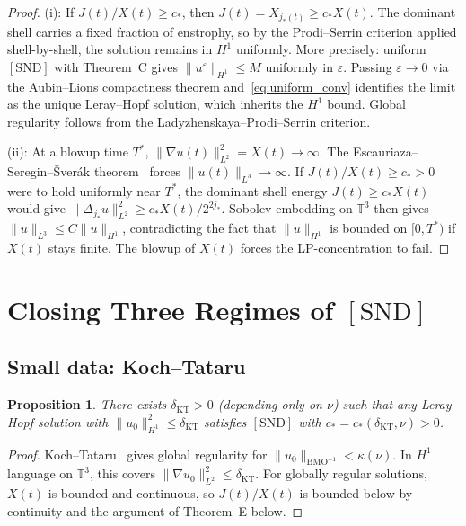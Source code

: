 \documentclass[11pt]{article}
\newtheorem{proposition}[theorem]{Proposition}
\newcommand{\eps}{\varepsilon}
\newcommand{\norm}[2]{\|{#1}\|_{#2}}
\newcommand{\T}{\mathbb{T}}
\begin{document}
\begin{proof}
(i): If $J(t)/X(t)\ge c_*$, then $J(t) = X_{j_*(t)}\ge c_* X(t)$.
The dominant shell carries a fixed fraction of enstrophy, so by
the Prodi--Serrin criterion applied shell-by-shell, the solution
remains in $H^1$ uniformly.
More precisely: uniform $[\mathrm{SND}]$ with Theorem~C gives
$\norm{u^\eps}{H^1}\le M$ uniformly in $\eps$. Passing $\eps\to0$
via the Aubin--Lions compactness theorem and~\eqref{eq:uniform_conv}
identifies the limit as the unique Leray--Hopf solution,
which inherits the $H^1$ bound. Global regularity follows from
the Ladyzhenskaya--Prodi--Serrin criterion.

(ii): At a blowup time $T^*$,
$\norm{\nabla u(t)}{L^2}^2 = X(t)\to\infty$.
The Escauriaza--Seregin--\v{S}ver\'ak theorem~\cite{ESS2003}
forces $\norm{u(t)}{L^3}\to\infty$.
If $J(t)/X(t)\ge c_*>0$ were to hold uniformly near $T^*$,
the dominant shell energy $J(t)\ge c_* X(t)$ would give
$\norm{\Delta_{j_*}u}{L^2}^2 \ge c_* X(t)/2^{2j_*}$.
Sobolev embedding on $\T^3$ then gives
$\norm{u}{L^3}\le C\norm{u}{H^1}$,
contradicting the fact that $\norm{u}{H^1}$ is
bounded on $[0,T^*)$ if $X(t)$ stays finite.
The blowup of $X(t)$ forces the LP-concentration to fail.
\end{proof}

\section{Closing Three Regimes of $[\mathrm{SND}]$}

\subsection{Small data: Koch--Tataru}

\begin{proposition}\label{prop:smalldata}
There exists $\delta_{\mathrm{KT}}>0$ (depending only on $\nu$)
such that any Leray--Hopf solution with
$\norm{u_0}{H^1}^2\le\delta_{\mathrm{KT}}$
satisfies $[\mathrm{SND}]$ with $c_*=c_*(\delta_{\mathrm{KT}},\nu)>0$.
\end{proposition}

\begin{proof}
Koch--Tataru~\cite{KT2001} gives global regularity for
$\norm{u_0}{\mathrm{BMO}^{-1}}<\kappa(\nu)$.
In $H^1$ language on $\T^3$, this covers
$\norm{\nabla u_0}{L^2}^2\le\delta_{\mathrm{KT}}$.
For globally regular solutions, $X(t)$ is bounded and continuous,
so $J(t)/X(t)$ is bounded below by continuity and the argument
of Theorem~E below.
\end{proof}
\end{document}
